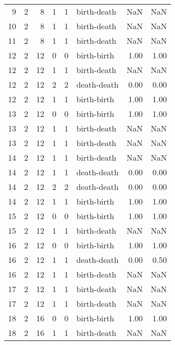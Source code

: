 \documentclass{article}
\begin{document}
\begin{center}
\begin{tabular}{rrrrrlrr}
9 & 2 & 8 & 1 & 1 & birth-death & NaN & NaN \\
10 & 2 & 8 & 1 & 1 & birth-death & NaN & NaN \\
11 & 2 & 8 & 1 & 1 & birth-death & NaN & NaN \\
12 & 2 & 12 & 0 & 0 & birth-birth & 1.00 & 1.00 \\
12 & 2 & 12 & 1 & 1 & birth-death & NaN & NaN \\
12 & 2 & 12 & 2 & 2 & death-death & 0.00 & 0.00 \\
12 & 2 & 12 & 1 & 1 & birth-birth & 1.00 & 1.00 \\
13 & 2 & 12 & 0 & 0 & birth-birth & 1.00 & 1.00 \\
13 & 2 & 12 & 1 & 1 & birth-death & NaN & NaN \\
13 & 2 & 12 & 1 & 1 & birth-death & NaN & NaN \\
14 & 2 & 12 & 1 & 1 & birth-death & NaN & NaN \\
14 & 2 & 12 & 1 & 1 & death-death & 0.00 & 0.00 \\
14 & 2 & 12 & 2 & 2 & death-death & 0.00 & 0.00 \\
14 & 2 & 12 & 1 & 1 & birth-birth & 1.00 & 1.00 \\
15 & 2 & 12 & 0 & 0 & birth-birth & 1.00 & 1.00 \\
15 & 2 & 12 & 1 & 1 & birth-death & NaN & NaN \\
16 & 2 & 12 & 0 & 0 & birth-birth & 1.00 & 1.00 \\
16 & 2 & 12 & 1 & 1 & death-death & 0.00 & 0.50 \\
16 & 2 & 12 & 1 & 1 & birth-death & NaN & NaN \\
17 & 2 & 12 & 1 & 1 & birth-death & NaN & NaN \\
17 & 2 & 12 & 1 & 1 & birth-death & NaN & NaN \\
18 & 2 & 16 & 0 & 0 & birth-birth & 1.00 & 1.00 \\
18 & 2 & 16 & 1 & 1 & birth-death & NaN & NaN \\
\bottomrule
\end{tabular}


\end{center}
\end{document}
